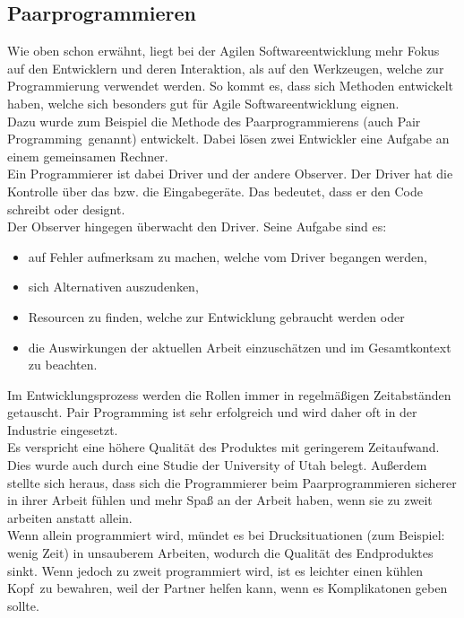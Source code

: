 \documentclass[a4paper, 10pt]{scrartcl}
\begin{document}
\subsection{Paarprogrammieren} \label{Paar}
Wie oben schon erwähnt, liegt bei der Agilen Softwareentwicklung mehr Fokus auf den Entwicklern und deren Interaktion, als auf den Werkzeugen, welche zur Programmierung verwendet werden. So kommt es, dass sich Methoden entwickelt haben, welche sich besonders gut für Agile Softwareentwicklung eignen.\\
Dazu wurde zum Beispiel die Methode des Paarprogrammierens (auch \glqq Pair Programming\grqq\ genannt) entwickelt. Dabei lösen zwei Entwickler eine Aufgabe an einem gemeinsamen Rechner.\\ 
Ein Programmierer ist dabei \glqq Driver\grqq{} und der andere \glqq Observer\grqq.
Der Driver hat die Kontrolle über das bzw. die Eingabegeräte. Das bedeutet, dass er den Code schreibt oder designt.\\
Der Observer hingegen \glqq überwacht\grqq{} den Driver. Seine Aufgabe sind es:
\begin{itemize}
\item auf Fehler aufmerksam zu machen, welche vom Driver begangen werden,
\item sich Alternativen auszudenken,
\item Resourcen zu finden, welche zur Entwicklung gebraucht werden oder
\item die Auswirkungen der aktuellen Arbeit einzuschätzen und im Gesamtkontext zu beachten.
\end{itemize}
Im Entwicklungsprozess werden die Rollen immer in regelmäßigen Zeitabständen getauscht. Pair Programming ist sehr erfolgreich und wird daher oft in der Industrie eingesetzt.\\
Es verspricht eine höhere Qualität des Produktes mit geringerem Zeitaufwand. Dies wurde auch durch eine Studie der University of Utah belegt. Außerdem stellte sich heraus, dass sich die Programmierer beim Paarprogrammieren sicherer in ihrer Arbeit fühlen und mehr Spaß an der Arbeit haben, wenn sie zu zweit arbeiten anstatt allein.\\
Wenn allein programmiert wird, mündet es bei Drucksituationen (zum Beispiel: wenig Zeit) in unsauberem Arbeiten, wodurch die Qualität des Endproduktes sinkt. Wenn jedoch zu zweit programmiert wird, ist es leichter einen \glqq kühlen Kopf\grqq\ zu bewahren, weil der Partner helfen kann, wenn es Komplikatonen geben sollte. \citep{pairprogramming}
\end{document}

